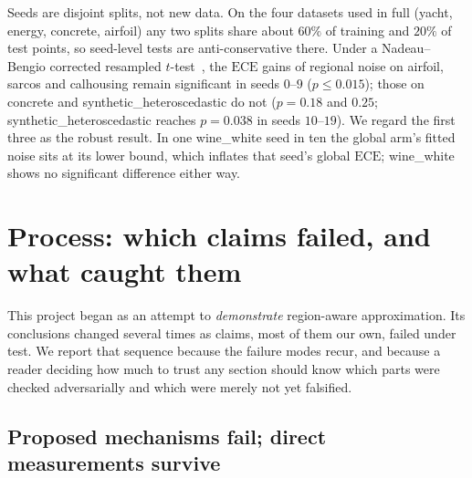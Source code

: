 \documentclass[11pt]{article}
\newcommand{\ece}{\mathrm{ECE}}
\begin{document}
Seeds are disjoint splits, not new data. On the four datasets used in full (yacht,
energy, concrete, airfoil) any two splits share about $60\%$ of training and $20\%$ of
test points, so seed-level tests are anti-conservative there. Under a Nadeau--Bengio
corrected resampled $t$-test~\citep{nadeau2003}, the $\ece$ gains of regional noise on
airfoil, sarcos and calhousing remain significant in seeds $0$--$9$ ($p\le0.015$);
those on concrete and synthetic\_heteroscedastic do not ($p=0.18$ and $0.25$;
synthetic\_heteroscedastic reaches $p=0.038$ in seeds $10$--$19$). We regard the first three as
the robust result. In one wine\_white seed in ten the global arm's fitted noise sits at
its lower bound, which inflates that seed's global $\ece$; wine\_white shows no
significant difference either way.

\section{Process: which claims failed, and what caught them}
\label{sec:process}

This project began as an attempt to \emph{demonstrate} region-aware approximation.
Its conclusions changed several times as claims, most of them our own, failed under
test. We report that sequence because the failure modes recur, and because a reader
deciding how much to trust any section should know which parts were checked
adversarially and which were merely not yet falsified.

\subsection{Proposed mechanisms fail; direct measurements survive}
\end{document}
